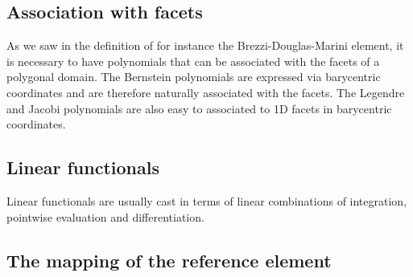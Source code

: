 
\subsection{Association with facets}
As we saw in the definition of for instance the  Brezzi-Douglas-Marini element,  
it is necessary to have polynomials that can be associated with the facets of a polygonal 
domain. The Bernstein polynomials are expressed via barycentric coordinates
and are therefore naturally associated with the facets. The Legendre and Jacobi polynomials are
also easy to associated to 1D facets in barycentric coordinates.  


\subsection{Linear functionals}
Linear functionals are usually cast in terms of linear combinations of integration, pointwise evaluation and differentiation. 

\subsection{The mapping of the reference element}

